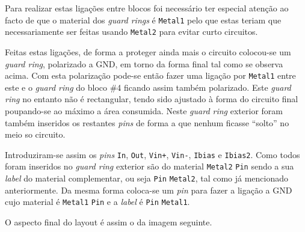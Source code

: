 \documentclass[11pt]{article}
\numberwithin{equation}{section}
\begin{document}
Para realizar estas ligações entre blocos foi necessário ter especial atenção ao facto de que o material dos \textit{guard rings} é \texttt{Metal1} pelo que estas teriam que necessariamente ser feitas usando \texttt{Metal2} para evitar curto circuitos. 

Feitas estas ligações, de forma a proteger ainda mais o circuito colocou-se um \textit{guard ring}, polarizado a GND, em torno da forma final tal como se observa acima. Com esta polarização pode-se então fazer uma ligação por \texttt{Metal1} entre este e o \textit{guard ring} do bloco \#4 ficando assim também polarizado. Este \textit{guard ring} no entanto não é rectangular, tendo sido ajustado à forma do circuito final poupando-se ao máximo a área consumida. Neste \textit{guard ring} exterior foram também inseridos os restantes \textit{pins} de forma a que nenhum ficasse ``solto'' no meio so circuito.

Introduziram-se assim os \textit{pins} \texttt{In}, \texttt{Out}, \texttt{Vin+}, \texttt{Vin-}, \texttt{Ibias} e \texttt{Ibias2}. Como todos foram inseridos no \textit{guard ring} exterior são do material \texttt{Metal2} \texttt{Pin} sendo a sua \textit{label} do material complementar, ou seja \texttt{Pin} \texttt{Metal2}, tal como já mencionado anteriormente. Da mesma forma coloca-se um \textit{pin} para fazer a ligação a GND cujo material é \texttt{Metal1} \texttt{Pin} e a \textit{label} é \texttt{Pin} \texttt{Metal1}.


O aspecto final do layout é assim o da imagem seguinte.
\end{document}
